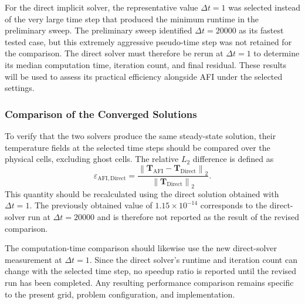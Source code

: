 For the direct implicit solver, the representative value
$\Delta t=1$ was selected instead of the very large
time step that produced the minimum runtime in the
preliminary sweep. The preliminary sweep identified
$\Delta t=20000$ as its fastest tested case, but this
extremely aggressive pseudo-time step was not retained
for the comparison. The direct solver must therefore be
rerun at $\Delta t=1$ to determine its median computation
time, iteration count, and final residual. These results
will be used to assess its practical efficiency alongside
AFI under the selected settings.

\subsubsection{Comparison of the Converged Solutions}

To verify that the two solvers produce the same
steady-state solution, their temperature fields at the
selected time steps should be compared over the physical
cells, excluding ghost cells. The relative $L_2$ difference
is defined as
\begin{equation}
    \varepsilon_{\mathrm{AFI,Direct}}
    =
    \frac{
    \left\|
    \mathbf{T}_{\mathrm{AFI}}
    -
    \mathbf{T}_{\mathrm{Direct}}
    \right\|_2
    }{
    \left\|
    \mathbf{T}_{\mathrm{Direct}}
    \right\|_2
    }.
    \label{eq:afi_direct_relative_difference}
\end{equation}
This quantity should be recalculated using the direct
solution obtained with $\Delta t=1$. The previously
obtained value of $1.15\times10^{-14}$ corresponds to
the direct-solver run at $\Delta t=20000$ and is therefore
not reported as the result of the revised comparison.

The computation-time comparison should likewise use the
new direct-solver measurement at $\Delta t=1$. Since the
direct solver's runtime and iteration count can change
with the selected time step, no speedup ratio is reported
until the revised run has been completed. Any resulting
performance comparison remains specific to the present
grid, problem configuration, and implementation.